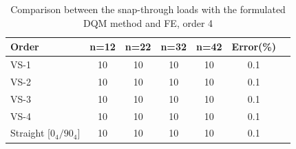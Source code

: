 \documentclass[journal]{new-aiaa}
\begin{document}
\begin{table}[!htb]
	\centering
	\setlength{\arrayrulewidth}{2pt}
	\begin{tabular}{lcccccc}
		\hline
		Order & n=12 & n=22 & n=32 & n=42 & Error(\%)\\
		\hline
		VS-1   & 10    & 10 & 10 & 10 & 0.1  \\
		VS-2  & 10    & 10 & 10 & 10 & 0.1  \\
		VS-3  & 10    & 10 & 10 & 10 & 0.1  \\
		VS-4  & 10    & 10 & 10 & 10 & 0.1  \\
		Straight [$0_4/90_4$]  & 10    & 10 & 10 & 10 & 0.1  \\
		\hline
	\end{tabular}
	\vspace{5 mm}
	\caption{Comparison between the snap-through loads with the formulated DQM method and FE, order 4}
	\label{phi45st2  }
\end{table}
\end{document}
